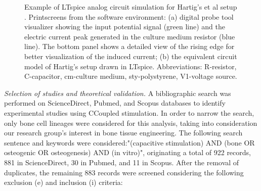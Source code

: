 \begin{figure}
\caption{Example of LTspice analog circuit simulation for Hartig's et al setup \cite{Hartig2000-ny}. Printscreens from the software environment: (a) digital probe tool visualizer showing the input potential signal (green line) and the electric current peak generated in the culture medium resistor (blue line). The bottom panel shows a detailed view of the rising edge for better visualization of the induced current; (b) the equivalent circuit model of Hartig's setup drawn in LTspice. Abbreviations: R-resistor, C-capacitor, cm-culture medium, sty-polystyrene, V1-voltage source.}
\label{fig5d6}
\end{figure}


\noindent \textit{Selection of studies and theoretical validation.} A bibliographic search was performed on ScienceDirect, Pubmed, and Scopus databases to identify experimental studies using \acs{CCoupled} stimulation. In order to narrow the search, only bone cell lineages were considered for this analysis, taking into consideration our research group's interest in bone tissue engineering. The following search sentence and keywords were considered:"(capacitive stimulation) AND (bone OR osteogenic OR osteogenesis) AND (in vitro)", originating a total of 922 records, 881 in ScienceDirect, 30 in Pubmed, and 11 in Scopus. After the removal of duplicates, the remaining 883 records were screened considering the following exclusion (e) and inclusion (i) criteria:

